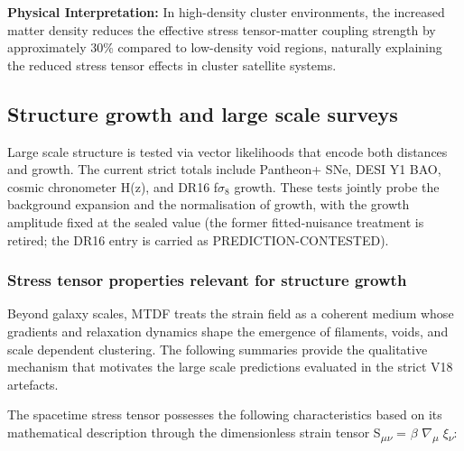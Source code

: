 \documentclass[11pt,a4paper]{article}
\begin{document}
\begin{mdframed}
\begin{mdframed}
\textbf{Physical Interpretation:} In high-density cluster environments, the increased matter density reduces the effective stress tensor-matter coupling strength by approximately 30\% compared to low-density void regions, naturally explaining the reduced stress tensor effects in cluster satellite systems.
\end{mdframed}
\end{mdframed}

\subsection{Structure growth and large scale surveys}
Large scale structure is tested via vector likelihoods that encode both distances and growth. The current strict totals include Pantheon+ SNe, DESI Y1 BAO, cosmic chronometer H(z), and DR16 f$\sigma$$_{8}$ growth. These tests jointly probe the background expansion and the normalisation of growth, with the growth amplitude fixed at the sealed value (the former fitted-nuisance treatment is retired; the DR16 entry is carried as PREDICTION-CONTESTED).

\subsubsection{Stress tensor properties relevant for structure growth}
Beyond galaxy scales, MTDF treats the strain field as a coherent medium whose gradients and relaxation dynamics shape the emergence of filaments, voids, and scale dependent clustering. The following summaries provide the qualitative mechanism that motivates the large scale predictions evaluated in the strict V18 artefacts.

The spacetime stress tensor possesses the following characteristics based on its mathematical description through the dimensionless strain tensor S\textsubscript{$\mu$$\nu$} = $\beta$ $\nabla$\textsubscript{$\mu$} $\xi$\textsubscript{$\nu$}:
\end{document}
